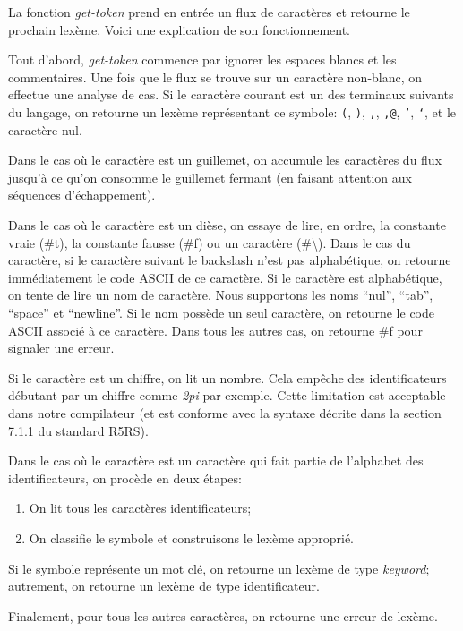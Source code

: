\documentclass[10pt]{report}
\begin{document}
La fonction \emph{get-token} prend en entrée un flux de caractères et
retourne le prochain lexème.  Voici une explication de son
fonctionnement.

Tout d'abord, \emph{get-token} commence par ignorer les espaces blancs
et les commentaires.  Une fois que le flux se trouve sur un caractère
non-blanc, on effectue une analyse de cas.  Si le caractère courant
est un des terminaux suivants du langage, on retourne un lexème
représentant ce symbole: \texttt{(}, \texttt{)}, \texttt{,},
\texttt{,@}, \texttt{'}, \texttt{`}, et le caractère nul.

Dans le cas où le caractère est un guillemet, on accumule les
caractères du flux jusqu'à ce qu'on consomme le guillemet fermant (en
faisant attention aux séquences d'échappement).

Dans le cas où le caractère est un dièse, on essaye de lire, en ordre,
la constante vraie (\#t), la constante fausse (\#f) ou un caractère
(\#\textbackslash).  Dans le cas du caractère, si le caractère suivant
le backslash n'est pas alphabétique, on retourne immédiatement le code
ASCII de ce caractère.  Si le caractère est alphabétique, on tente de
lire un nom de caractère.  Nous supportons les noms ``nul'', ``tab'',
``space'' et ``newline''.  Si le nom possède un seul caractère, on
retourne le code ASCII associé à ce caractère.  Dans tous les autres
cas, on retourne \#f pour signaler une erreur.

Si le caractère est un chiffre, on lit un nombre.  Cela empêche des
identificateurs débutant par un chiffre comme \emph{2pi} par exemple.
Cette limitation est acceptable dans notre compilateur (et est
conforme avec la syntaxe décrite dans la section 7.1.1 du standard
R5RS).

Dans le cas où le caractère est un caractère qui fait partie de
l'alphabet des identificateurs, on procède en deux étapes:

\begin{enumerate}
\item On lit tous les caractères identificateurs;
\item On classifie le symbole et construisons le lexème approprié.
\end{enumerate}

Si le symbole représente un mot clé, on retourne un lexème de type
\emph{keyword}; autrement, on retourne un lexème de type
identificateur.

Finalement, pour tous les autres caractères, on retourne une erreur de
lexème.
\end{document}

